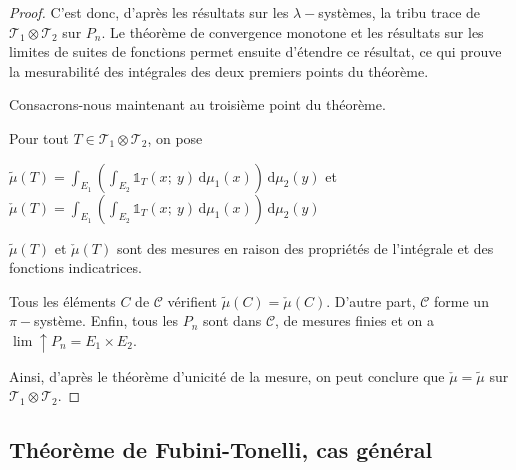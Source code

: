 \begin{proof}
C'est donc, d'après les résultats sur les $\lambda-$systèmes, la tribu trace de $\mathcal{T}_1 \otimes \mathcal{T}_2$ sur $P_n$. Le théorème de convergence monotone et les résultats sur les limites de suites de fonctions permet ensuite d'étendre ce résultat, ce qui prouve la mesurabilité des intégrales des deux premiers points du théorème.

Consacrons-nous maintenant au troisième point du théorème.

Pour tout $T \in \mathcal{T}_1 \otimes \mathcal{T}_2$, on pose

$\tilde{\mu}(T)= \displaystyle{\int_{E_1}} \left(\displaystyle{\int_{E_2}} \displaystyle{\mathbb{1}}_{T}(x;~y)  \, \mathrm d \mu_1(x)\right)  \, \mathrm d \mu_2(y)$ et $\check{\mu}(T)= \displaystyle{\int_{E_1}} \left(\displaystyle{\int_{E_2}} \displaystyle{\mathbb{1}}_{T}(x;~y)  \, \mathrm d \mu_1(x)\right) \,  \mathrm d \mu_2(y)$

$\tilde{\mu}(T)$ et $\check{\mu}(T)$ sont des mesures en raison des propriétés de l'intégrale et des fonctions indicatrices.

Tous les éléments $C$ de $\mathcal{C}$ vérifient $\tilde{\mu}(C) = \check{\mu}(C)$. D'autre part, $\mathcal{C}$ forme un $\pi-$système. Enfin, tous les $P_n$ sont dans $\mathcal{C}$, de mesures finies et on a $\lim \uparrow P_n = E_1 \times E_2$.

Ainsi, d'après le théorème d'unicité de la mesure, on peut conclure que $\check{\mu} = \tilde{\mu}$ sur $\mathcal{T}_1 \otimes \mathcal{T}_2$.
\end{proof}

\subsection{Théorème de Fubini-Tonelli, cas général}

